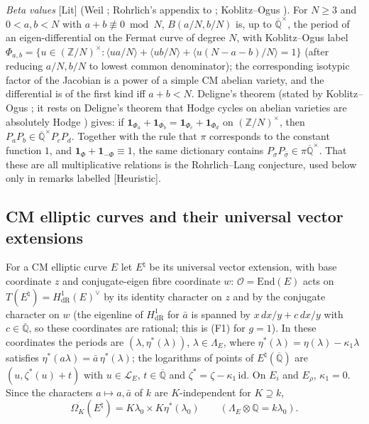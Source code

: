 \documentclass[11pt]{amsart}
\theoremstyle{definition}
\newcommand{\Qb}{\overline{\mathbb{Q}}}
\newcommand{\Q}{\mathbb{Q}}
\newcommand{\Z}{\mathbb{Z}}
\newcommand{\Lg}{\mathcal{L}}
\newcommand{\lab}[1]{\textup{[#1]}}
\begin{document}
\smallskip
\noindent\emph{Beta values} \lab{Lit} (Weil \cite{We76}; Rohrlich's appendix to \cite{Gr78}; Koblitz--Ogus \cite{KO79}). For $N\ge3$
and $0<a,b<N$ with $a+b\not\equiv0\bmod N$, $B(a/N,b/N)$ is, up to $\Qb^\times$, the period of an eigen-differential on
the Fermat curve of degree $N$, with Koblitz--Ogus label $\Phi_{a,b}=\{u\in(\Z/N)^\times:\langle ua/N\rangle+\langle
ub/N\rangle+\langle u(N-a-b)/N\rangle=1\}$ (after reducing $a/N,b/N$ to lowest common denominator); the corresponding
isotypic factor of the Jacobian is a power of a simple CM abelian variety, and the differential is of the first kind iff
$a+b<N$. Deligne's theorem (stated by Koblitz--Ogus \cite{KO79}; it rests on Deligne's theorem that Hodge cycles on
abelian varieties are absolutely Hodge \cite{De82}) gives: if
$\mathbf 1_{\Phi_a}+\mathbf 1_{\Phi_b}=\mathbf 1_{\Phi_c}+\mathbf 1_{\Phi_d}$ on $(\Z/N)^\times$, then
$P_aP_b\in\Qb^\times P_cP_d$. Together with the rule that $\pi$ corresponds to the constant function $1$, and
$\mathbf 1_\Phi+\mathbf 1_{-\Phi}\equiv1$, the same dictionary contains $P_\sigma P_{\bar\sigma}\in\pi\Qb^\times$.
That these are all multiplicative relations is the Rohrlich--Lang conjecture, used below only in remarks labelled
\lab{Heuristic}.

\subsection{CM elliptic curves and their universal vector extensions}\label{sec:Euniv}
For a CM elliptic curve $E$ let $E^\natural$ be its universal vector extension, with base coordinate $z$ and conjugate-eigen
fibre coordinate $w$: $\mathcal O=\mathrm{End}(E)$ acts on $T(E^\natural)=H^1_{\mathrm{dR}}(E)^\vee$ by its identity
character on $z$ and by the conjugate character on $w$ (the eigenline of $H^1_{\mathrm{dR}}$ for $\bar a$ is spanned by
$x\,dx/y+c\,dx/y$ with $c\in\Qb$, so these coordinates are rational; this is (F1) for $g=1$).
In these coordinates the periods are $(\lambda,\eta^*(\lambda))$,
$\lambda\in\Lambda_E$, where $\eta^*(\lambda)=\eta(\lambda)-\kappa_1\lambda$ satisfies $\eta^*(a\lambda)=\bar a\,\eta^*(\lambda)$;
the logarithms of points of $E^\natural(\Qb)$ are $(u,\zeta^*(u)+t)$ with $u\in\Lg_E$, $t\in\Qb$ and
$\zeta^*=\zeta-\kappa_1\,\mathrm{id}$. On $E_i$ and $E_\rho$, $\kappa_1=0$. Since the characters $a\mapsto a,\bar a$ of $k$
are $K$-independent for $K\supseteq k$,
\begin{equation}\label{eq:split}
\Omega_K(E^\natural)=K\lambda_0\times K\eta^*(\lambda_0)\qquad(\Lambda_E\otimes\Q=k\lambda_0).
\end{equation}
\end{document}
